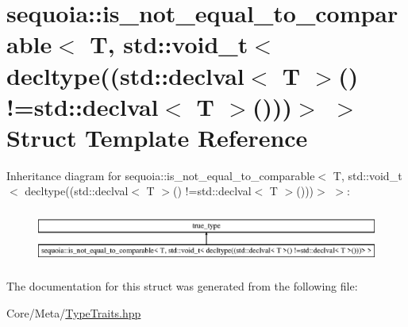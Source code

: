 \hypertarget{structsequoia_1_1is__not__equal__to__comparable_3_01_t_00_01std_1_1void__t_3_01decltype_07_07stda046c42576a8423b543392105dd6eb81}{}\section{sequoia\+::is\+\_\+not\+\_\+equal\+\_\+to\+\_\+comparable$<$ T, std\+::void\+\_\+t$<$ decltype((std\+::declval$<$ T $>$() !=std\+::declval$<$ T $>$()))$>$ $>$ Struct Template Reference}
\label{structsequoia_1_1is__not__equal__to__comparable_3_01_t_00_01std_1_1void__t_3_01decltype_07_07stda046c42576a8423b543392105dd6eb81}
Inheritance diagram for sequoia\+::is\+\_\+not\+\_\+equal\+\_\+to\+\_\+comparable$<$ T, std\+::void\+\_\+t$<$ decltype((std\+::declval$<$ T $>$() !=std\+::declval$<$ T $>$()))$>$ $>$\+:\begin{figure}[H]
\begin{center}
\leavevmode
\includegraphics[height=1.786284cm]{structsequoia_1_1is__not__equal__to__comparable_3_01_t_00_01std_1_1void__t_3_01decltype_07_07stda046c42576a8423b543392105dd6eb81}
\end{center}
\end{figure}


The documentation for this struct was generated from the following file\+:\begin{DoxyCompactItemize}
\item 
Core/\+Meta/\mbox{\hyperlink{_type_traits_8hpp}{Type\+Traits.\+hpp}}\end{DoxyCompactItemize}
